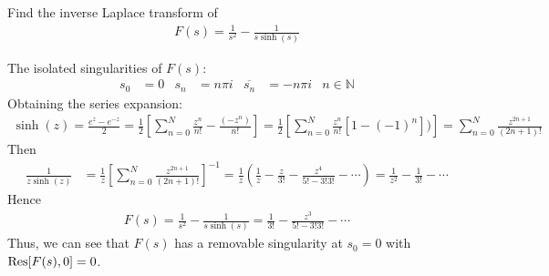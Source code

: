\documentclass[12pt, english]{book}
\makeatletter
\renewenvironment{proof}[1][\proofname]{\par
	\pushQED{\qed}%
	\normalfont \topsep6\p@\@plus6\p@\relax
	\list{}{%
		\settowidth{\leftmargin}{\itshape\proofname:\hskip\labelsep}%
		\setlength{\labelwidth}{0pt}%
		\setlength{\itemindent}{-\leftmargin}%
	}%
	\item[\hskip\labelsep\itshape#1\@addpunct{:}]\ignorespaces
	}{ \popQED\endlist\@endpefalse}
\makeatother
\begin{document}
	\begin{example}
		Find the inverse Laplace transform of
		\begin{align*}
			F(s) = \frac{1}{s^2} - \frac{1}{s \sinh(s)}
		\end{align*}
		\begin{proof}
			{\color{Grey}
			The isolated singularities of \(F(s)\):
			\begin{align*}
				s_0 &= 0 & s_n &= n\pi i & \overline{s_n} &= -n\pi i & n \in \mathbb{N}
			\end{align*}
			Obtaining the series expansion:
			\begin{align*}
				\sinh(z) = \frac{e^z - e^{-z}}{2} = \frac{1}{2}\left[\sum_{n=0}^{N} \frac{z^n}{n!} - \frac{(-z^n)}{n!}\right] = \frac{1}{2}\left[\sum_{n=0}^{N} \frac{z^n}{n!}[1-(-1)^n])\right] = \sum_{n=0}^{N} \frac{z^{2n+1}}{(2n+1)!}
			\end{align*}
			Then 
			\begin{align*}
				\frac{1}{z\sinh(z)} 
				&= \frac{1}{z} \left[ \sum_{n=0}^{N} \frac{z^{2n+1}}{(2n+1)!} \right]^{-1}
				 = \frac{1}{z} \left(\frac{1}{z} - \frac{z}{3!} - \frac{z^4}{5! - 3!3!} - \cdots \right)
				 = \frac{1}{z^2} - \frac{1}{3!} - \cdots 
			\end{align*}
			Hence
			\begin{align*}
				F(s) = \frac{1}{s^2} - \frac{1}{s \sinh(s)} = \frac{1}{3!} - \frac{z^3}{5! - 3!3!} - \cdots
			\end{align*}
			Thus, we can see that \(F(s)\) has a removable singularity at \(s_0 = 0\) with \(\Res[F(s), 0] = 0\).
			
}
\end{proof}
\end{example}
\end{document}
